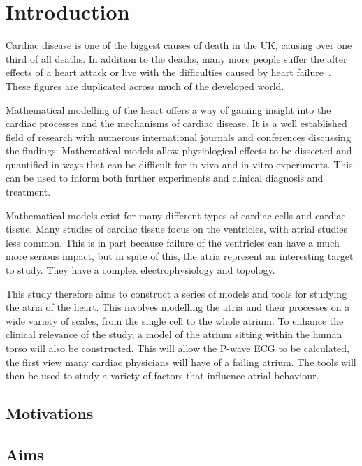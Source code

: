 \chapter{Introduction}

Cardiac disease is one of the biggest causes of death in the UK, causing over
one third of all deaths.
In addition to the deaths, many more people suffer the after effects of a heart
attack or live with the difficulties caused by heart failure~\cite{bhf2008}.
These figures are duplicated across much of the developed world.

Mathematical modelling of the heart offers a way of gaining insight into the
cardiac processes and the mechanisms of cardiac disease.
It is a well established field of research with numerous international journals
and conferences discussing the findings.
Mathematical models allow physiological effects to be dissected and quantified
in ways that can be difficult for in vivo and in vitro experiments.
This can be used to inform both further experiments and clinical diagnosis and
treatment.

Mathematical models exist for many different types of cardiac cells and
cardiac tissue.
Many studies of cardiac tissue focus on the ventricles, with atrial studies less
common.
This is in part because failure of the ventricles can have a much more serious
impact, but in spite of this, the atria represent an interesting target to
study.
They have a complex electrophysiology and topology.

This study therefore aims to construct a series of models and tools for studying
the atria of the heart.
This involves modelling the atria and their processes on a wide variety of scales,
from the single cell to the whole atrium.
To enhance the clinical relevance of the study, a model of the atrium sitting
within the human torso will also be constructed.
This will allow the P-wave ECG to be calculated, the first view many cardiac
physicians will have of a failing atrium.
The tools will then be used to study a variety of factors that influence atrial
behaviour.

\section{Motivations}

\section{Aims}

